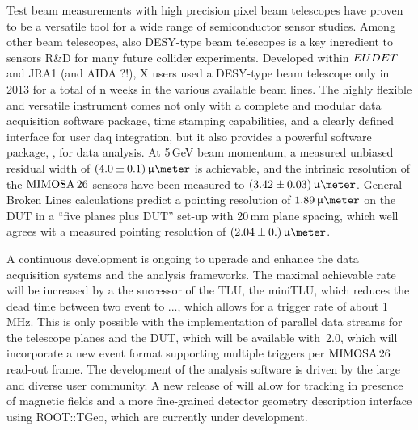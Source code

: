 
Test beam measurements with high precision pixel beam telescopes have proven to be a versatile tool for a wide range of semiconductor sensor studies. 
Among other beam telescopes, also DESY-type beam telescopes is a key ingredient to sensors R\&D for many future collider experiments. 
Developed within $EUDET$ and JRA1 (and AIDA ?!), X users used a DESY-type beam telescope only in 2013 for a total of n weeks in the various available beam lines. 
The highly flexible and versatile instrument comes not only with a complete and modular data acquisition software package, time stamping capabilities, and a clearly defined interface for user daq integration,
 but it also provides a powerful software package, \EUTelescope, for data analysis. 
At 5\,GeV beam momentum, a measured unbiased residual width of $(4.0 \pm 0.1)\,\upmu\meter$ is achievable,
 and the intrinsic resolution of the $\textrm{MIMOSA\,26}$ sensors have been measured to $(3.42 \pm 0.03)\,\upmu\meter$.
General Broken Lines calculations predict a pointing resolution of $1.89\,\upmu\meter$ on the DUT in a ``five planes plus DUT'' set-up with 20\,mm plane spacing,
 which well agrees wit a measured pointing resolution of $(2.04 \pm 0.)\,\upmu\meter$.

A continuous development is ongoing to upgrade and enhance the data acquisition systems and the analysis frameworks.  
The maximal achievable rate will be increased by a the successor of the TLU, the miniTLU, which reduces the dead time between two event to ...,  which allows for a trigger rate of about 1\,MHz.
This is only possible with the implementation of parallel data streams for the telescope planes and the DUT, which will be available with \eudaq\,{2.0},
 which will incorporate a new event format supporting multiple triggers per $\textrm{MIMOSA\,26}$ read-out frame. 
The development of the analysis software is driven by the large and diverse user community. 
A new release of \EUTelescope will allow for tracking in presence of magnetic fields and a more fine-grained detector geometry description interface using ROOT::TGeo, which are currently under development.

